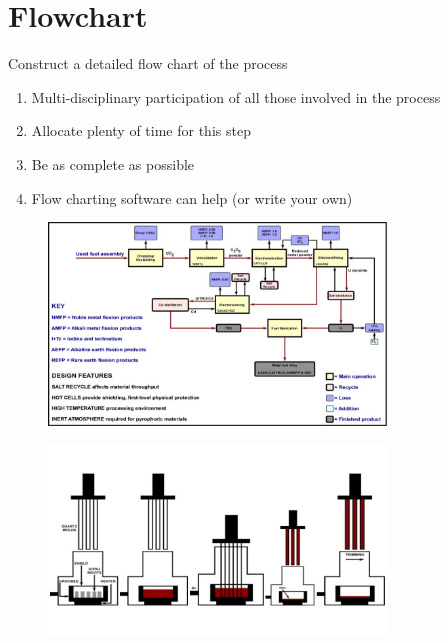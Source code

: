\documentclass[aspectratio=1610,pdftex,dvipsnames,compress,xcolor={dvipsnames}]{beamer}
\begin{document}
\section{Flowchart}


\addtocounter{framenumber}{-2}
\begin{frame}{Construct a detailed flow chart of the process}
    \begin{enumerate}[series=outerlist,topsep=0pt,itemsep=21pt,leftmargin=*,label=(\arabic*)]
        \item[]Multi-disciplinary participation of all those involved in the process
        \item[]Allocate plenty of time for this step
        \item[]Be as complete as possible
        \item[]Flow charting software can help (or write your own)
    \end{enumerate}
\end{frame}


\begin{frame}{}
    \begin{figure}
        \centering
        \includegraphics[width=0.80\textwidth]{pyroprocessing.flowsheet.jpg}
    \end{figure}
\end{frame}


\begin{frame}{}
    \begin{figure}
        \centering
        \includegraphics[width=0.80\textwidth]{fuel.fabrication.jpg}
    \end{figure}
\end{frame}
\end{document}
